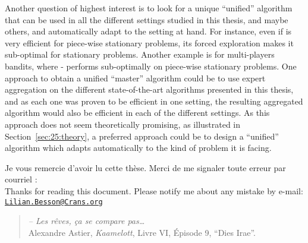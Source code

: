 Another question of highest interest is to look for a unique ``unified'' algorithm that can be used in all the different settings studied in this thesis, and maybe others, and automatically adapt to the setting at hand.
For instance, even if \GLRklUCB{} is very efficient for piece-wise stationary problems, its forced exploration makes it sub-optimal for stationary problems.
Another example is for multi-players bandits, where \MCTopM-\klUCB{} performs sub-optimally on piece-wise stationary problems.
One approach to obtain a unified ``master'' algorithm could be to use expert aggregation on the different state-of-the-art algorithms presented in this thesis, and as each one was proven to be efficient in one setting, the resulting aggregated algorithm would also be efficient in each of the different settings.
As this approach does not seem theoretically promising, as illustrated in Section~\ref{sec:25:theory},
a preferred approach could be to design a ``unified'' algorithm which adapts automatically to the kind of problem it is facing.






\hr{}

\vfill{}

\begin{center}
    Je vous remercie d'avoir lu cette thèse. Merci de me signaler toute erreur par courriel :
    \\
    Thanks for reading this document. Please notify me about any mistake by e-mail:\\
    \href{https://github.com/Naereen/phd-thesis/issues/new}{\texttt{Lilian.Besson}\texttt{@}\texttt{Crans.org}}
\end{center}


\vfill{}


\begin{small}
\begin{quote}
    \emph{-- Les rêves, ça se compare pas\ldots}\\
    Alexandre Astier, \emph{Kaamelott}, Livre VI, Épisode 9, ``Dies Irae''.
\end{quote}
\end{small}
